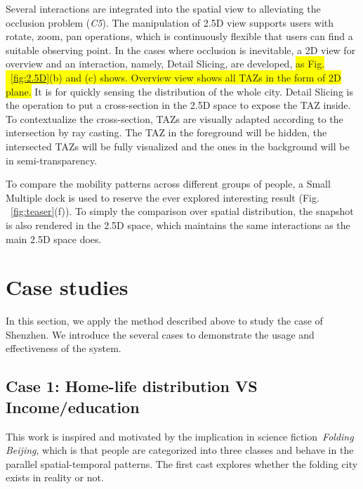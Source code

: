 \documentclass{ieeeaccess}
\begin{document}
Several interactions are integrated into the spatial view to alleviating the occlusion problem (\textit{C5}). The manipulation of 2.5D view supports users with rotate, zoom, pan operations, which is continuously flexible that users can find a suitable observing point. In the cases where occlusion is inevitable, a 2D view for overview and an interaction, namely, Detail Slicing, are developed, \colorbox{yellow}{as Fig. ~\ref{fig:2.5D}(b) and (c) shows. Overview view shows all TAZs in the form of 2D plane.} It is for quickly sensing the distribution of the whole city. Detail Slicing is the operation to put a cross-section in the 2.5D space to expose the TAZ inside. To contextualize the cross-section, TAZs are visually adapted according to the intersection by ray casting. The TAZ in the foreground will be hidden, the intersected TAZs will be fully visualized and the ones in the background will be in semi-transparency.

 To compare the mobility patterns across different groups of people, a Small Multiple dock is used to reserve the ever explored interesting result (Fig. ~\ref{fig:teaser}(f)). To simply the comparison over spatial distribution, the snapshot is also rendered in the 2.5D space, which maintains the same interactions as the main 2.5D space does.


\section{Case studies}

In this section, we apply the method described above to study the case of Shenzhen. We introduce the several cases to demonstrate the usage and effectiveness of the system.

\subsection{Case 1: Home-life distribution VS Income/education}

This work is inspired and motivated by the implication in science fiction~\textit{Folding Beijing}, which is that people are categorized into three classes and behave in the parallel spatial-temporal patterns. The first cast explores whether the folding city exists in reality or not.
\end{document}
